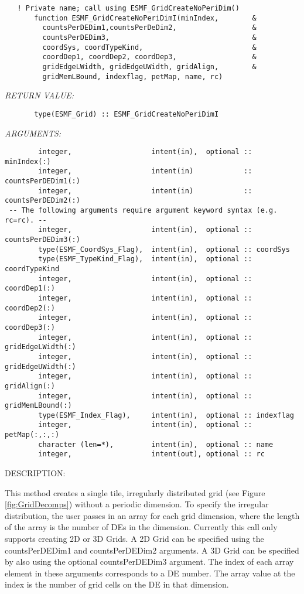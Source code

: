  
\begin{verbatim}   ! Private name; call using ESMF_GridCreateNoPeriDim()
       function ESMF_GridCreateNoPeriDimI(minIndex,        &
         countsPerDEDim1,countsPerDeDim2,                  &
         countsPerDEDim3,                                  &
         coordSys, coordTypeKind,                          &
         coordDep1, coordDep2, coordDep3,                  &
         gridEdgeLWidth, gridEdgeUWidth, gridAlign,        &
         gridMemLBound, indexflag, petMap, name, rc)\end{verbatim}{\em RETURN VALUE:}
\begin{verbatim}       type(ESMF_Grid) :: ESMF_GridCreateNoPeriDimI\end{verbatim}{\em ARGUMENTS:}
\begin{verbatim}        integer,                   intent(in),  optional :: minIndex(:)
        integer,                   intent(in)            :: countsPerDEDim1(:)
        integer,                   intent(in)            :: countsPerDEDim2(:)
 -- The following arguments require argument keyword syntax (e.g. rc=rc). --
        integer,                   intent(in),  optional :: countsPerDEDim3(:)
        type(ESMF_CoordSys_Flag),  intent(in),  optional :: coordSys
        type(ESMF_TypeKind_Flag),  intent(in),  optional :: coordTypeKind
        integer,                   intent(in),  optional :: coordDep1(:)
        integer,                   intent(in),  optional :: coordDep2(:)
        integer,                   intent(in),  optional :: coordDep3(:)
        integer,                   intent(in),  optional :: gridEdgeLWidth(:)
        integer,                   intent(in),  optional :: gridEdgeUWidth(:)
        integer,                   intent(in),  optional :: gridAlign(:)
        integer,                   intent(in),  optional :: gridMemLBound(:)
        type(ESMF_Index_Flag),     intent(in),  optional :: indexflag
        integer,                   intent(in),  optional :: petMap(:,:,:)
        character (len=*),         intent(in),  optional :: name
        integer,                   intent(out), optional :: rc\end{verbatim}
{\sf DESCRIPTION:\\ }


  
   This method creates a single tile, irregularly distributed grid
   (see Figure \ref{fig:GridDecomps}) without a periodic dimension.
   To specify the irregular distribution, the user passes in an array
   for each grid dimension, where the length of the array is the number
   of DEs in the dimension. Currently this call only
   supports creating 2D or 3D Grids. A 2D Grid can be specified using the
   countsPerDEDim1 and countsPerDEDim2 arguments.  A 3D Grid can
   be specified by also using the optional countsPerDEDim3 argument.
   The index of each array element in these arguments corresponds to
   a DE number.  The array value at the index is the number of grid
   cells on the DE in that dimension.
  
